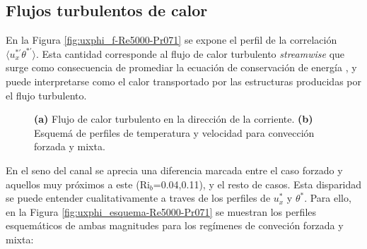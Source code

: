 \subsection{Flujos turbulentos de calor} 

En la Figura \ref{fig:uxphi_f-Re5000-Pr071} se expone el perfil de la correlación $\langle u_x^{\ast \prime } \theta^{\ast \prime } \rangle$. Esta cantidad corresponde al flujo de calor turbulento \textit{streamwise} que surge como consecuencia de promediar la ecuación de conservación de energía \cite{kundu,pope2001turbulent}, y puede interpretarse como el calor transportado por las estructuras producidas por el flujo turbulento. 

\begin{figure}[H]
  \centering
    \caption{\textbf{(a)} Flujo de calor turbulento en la dirección de la corriente. \textbf{(b)} Esquemá de perfiles de temperatura y velocidad para convección forzada y mixta.}
    \label{fig:rms-Re5000-Pr071}
\end{figure}

En el seno del canal se aprecia una diferencia marcada entre el caso forzado y aquellos muy próximos a este (Ri$_b$=0.04,0.11), y el resto de casos. Esta disparidad se puede entender cualitativamente a traves de los perfiles de $u^*_x$ y $\theta^*$. Para ello, en la Figura \ref{fig:uxphi_esquema-Re5000-Pr071} se muestran los perfiles esquemáticos de ambas magnitudes para los regímenes de conveción forzada y mixta:

